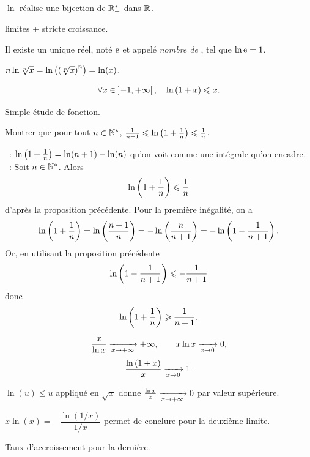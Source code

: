 \documentclass{magnolia}
\begin{document}
\begin{proposition}[utile=-3]
$\ln$ réalise une bijection de $\mathbb{R}_+^*$ dans $\mathbb{R}$.
\end{proposition}

\begin{preuve}
limites + stricte croissance.
\end{preuve}

\begin{definition}[utile=-3]
Il existe un unique réel, noté ${\rm e}$ et appelé \emph{nombre de }, tel que $\ln {\rm e}=1$.
\end{definition}



\begin{preuve}
$n\ln\sqrt[n]{x}=\ln\left(\left(\sqrt[n]{x}\right)^{n}\right)=\ln(x)$.
\end{preuve}


\begin{proposition}[utile=-3]
\[\forall x\in\left]-1,+\infty\right[ ,\quad \ln\left(1+x\right)\leqslant x.\]  
\end{proposition}

\begin{preuve}
Simple étude de fonction.
\end{preuve}


\begin{exoUnique}
\exemple Montrer que pour tout $n\in{\mathbb{N}^*}$,
  $\frac{1}{n+1}\leqslant\ln\left(1+\frac{1}{n}\right)\leqslant\frac{1}{n}$.
\end{exoUnique}

\begin{sol}
~: $\ln\left(1+\frac{1}{n}\right)=\ln(n+1)-\ln(n)$ qu'on voit comme une intégrale qu'on encadre.\\
~: Soit $n\in{\mathbb{N}^*}$. Alors
\[\ln\left(1+\frac{1}{n}\right)\leqslant\frac{1}{n}\]
d'après la proposition précédente. Pour la première inégalité, on a
\[\ln\left(1+\frac{1}{n}\right)=\ln\left(\frac{n+1}{n}\right)=-\ln\left(\frac{n}{n+1}\right)=-\ln\left(1-\frac{1}{n+1}\right).\]
Or, en utilisant la proposition précédente
\[\ln\left(1-\frac{1}{n+1}\right)\leqslant -\frac{1}{n+1}\]
donc
\[\ln\left(1+\frac{1}{n}\right)\geqslant\frac{1}{n+1}.\]
\end{sol}

\begin{proposition}[utile=-3]
\[\frac{x}{\ln x}\xrightarrow[x\rightarrow +\infty]{} +\infty, \qquad
  x\ln x\xrightarrow[x\rightarrow 0]{} 0,\]
\[\frac{\ln\left(1+x\right)}{x} \xrightarrow[x\rightarrow 0]{} 1.\]  
\end{proposition}

\begin{preuve}
$\ln(u)\leq u$ appliqué en $\sqrt{x}$ donne $\frac{\ln x}{x}\xrightarrow[x\rightarrow +\infty]{} 0$ par valeur supérieure.

$x\ln(x)=-\dfrac{\ln(1/x)}{1/x}$ permet de conclure pour la deuxième limite.

Taux d'accroissement pour la dernière.

\end{preuve}
\end{document}
